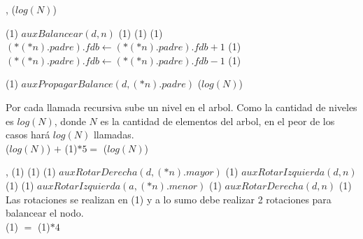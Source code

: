 {   ,
    }
{}
{\bigo($log(N)$)}
{                             \comment \bigo(1)
        \State $auxBalancear(d, n)$                                     \comment \bigo(1)
    \Else
                                           \comment \bigo(1)
                                        \comment \bigo(1)
                \State $(*(*n).padre).fdb \gets (*(*n).padre).fdb + 1$  \comment \bigo(1)
            \Else
                \State $(*(*n).padre).fdb \gets (*(*n).padre).fdb - 1$  \comment \bigo(1)
            \EndIf

                                       \comment \bigo(1)
                \State $auxPropagarBalance(d, (*n).padre)$              \comment \bigo($log(N)$)
            \EndIf
        \EndIf
    \EndIf
}
{   Por cada llamada recursiva sube un nivel en el arbol. Como la cantidad de niveles es
    $log(N)$, donde $N$ es la cantidad de elementos del arbol, en el peor de los casos
    hará $log(N)$ llamadas. \\
    \hspace*{8em} \bigo($log(N)$) $+$ \bigo(1)$*5 =$ \bigo($log(N)$)}


{   ,
    }
{}
{\bigo(1)}
{                                  \comment \bigo(1)
                          \comment \bigo(1)
            \State $auxRotarDerecha(d, (*n).mayor)$     \comment \bigo(1)
        \EndIf
        \State $auxRotarIzquierda(d, n)$                \comment \bigo(1)
    \Else
                          \comment \bigo(1)
            \State $auxRotarIzquierda(a, (*n).menor)$   \comment \bigo(1)
        \EndIf
        \State $auxRotarDerecha(d, n)$                  \comment \bigo(1)
    \EndIf
}
{   Las rotaciones se realizan en \bigo(1) y a lo sumo debe realizar 2
    rotaciones para balancear el nodo. \\
    \hspace*{8em} \bigo(1) $=$ \bigo(1)$*4$}


